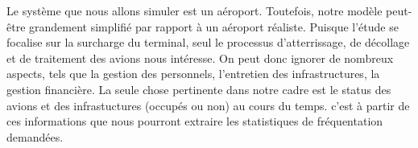 
Le système que nous allons simuler est un aéroport. Toutefois, notre modèle peut-être grandement simplifié par rapport à  un aéroport réaliste. Puisque l'étude se focalise sur la surcharge du terminal, seul le processus d'atterrissage, de décollage et de traitement des avions nous intéresse. On peut donc ignorer de nombreux aspects, tels que la gestion des personnels, l'entretien des infrastructures, la gestion financière.
La seule chose pertinente dans notre cadre est le status des avions et des infrastuctures (occupés ou non) au cours du temps. c'est à partir de ces informations que nous pourront extraire les statistiques de fréquentation demandées.
